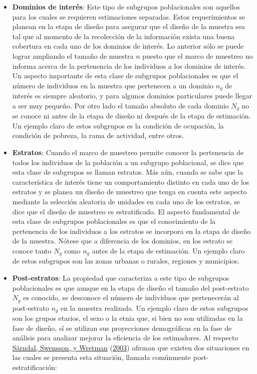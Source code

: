 \documentclass[
  12pt,
  spanish,
]{book}
\begin{document}
\begin{itemize}
\item
  \textbf{Dominios de interés}: Este tipo de subgrupos poblacionales son aquellos para los cuales se requieren estimaciones separadas. Estos requerimientos se planean en la etapa de diseño para asegurar que el diseño de la muestra sea tal que al momento de la recolección de la información exista una buena cobertura en cada uno de los dominios de interés. Lo anterior sólo se puede lograr ampliando el tamaño de muestra \(n\) puesto que el marco de muestreo no informa acerca de la pertenencia de los individuos a los dominios de interés. Un aspecto importante de esta clase de subgrupos poblacionales es que el número de individuos en la muestra que pertenecen a un dominio \(n_g\) de interés es siempre aleatorio, y para algunos dominios particulares puede llegar a ser muy pequeño. Por otro lado el tamaño absoluto de cada dominio \(N_g\) no se conoce ni antes de la etapa de diseño ni después de la etapa de estimación. Un ejemplo claro de estos subgrupos es la condición de ocupación, la condición de pobreza, la rama de actividad, entre otros.
\item
  \textbf{Estratos}: Cuando el marco de muestreo permite conocer la pertenencia de todos los individuos de la población a un subgrupo poblacional, se dice que esta clase de subgrupos se llaman estratos. Más aún, cuando se sabe que la característica de interés tiene un comportamiento distinto en cada uno de los estratos y se planea un diseño de muestreo que tenga en cuenta este aspecto mediante la selección aleatoria de unidades en cada uno de los estratos, se dice que el diseño de muestreo es estratificado. El aspecto fundamental de esta clase de subgrupos poblacionales es que el conocimiento de la pertenencia de los individuos a los estratos se incorpora en la etapa de diseño de la muestra. Nótese que a diferencia de los dominios, en los estrato se conoce tanto \(N_g\) como \(n_g\) antes de la etapa de estimación. Un ejemplo claro de estos subgrupos son las zonas urbanas o rurales, regiones y municipios.
\item
  \textbf{Post-estratos}: La propiedad que caracteriza a este tipo de subgrupos poblacionales es que aunque en la etapa de diseño el tamaño del post-estrato \(N_g\) es conocido, se desconoce el número de individuos que pertenecerán al post-estrato \(n_g\) en la muestra realizada. Un ejemplo claro de estos subgrupos son los grupos etarios, el sexo o la etnia que, si bien no son utilizadas en la fase de diseño, sí se utilizan sus proyecciones demográficas en la fase de análisis para analizar mejorar la eficiencia de los estimadores. Al respecto \protect\hyperlink{ref-Sarndal_Swensson_Wretman_2003}{Särndal, Swensson, y Wretman} (\protect\hyperlink{ref-Sarndal_Swensson_Wretman_2003}{2003}) afirman que existen dos situaciones en las cuales se presenta esta situación, llamada comúnmente post-estratificación:


\end{itemize}
\end{document}
